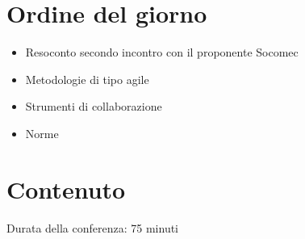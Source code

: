 \section{Ordine del giorno}
\begin{itemize}
    \item Resoconto secondo incontro con il proponente Socomec
    \item Metodologie di tipo agile
    \item Strumenti di collaborazione
    \item Norme
\end{itemize}
\section{Contenuto}
Durata della conferenza: 75 minuti
\newline
